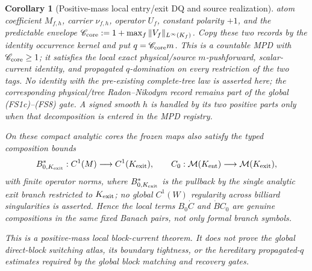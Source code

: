 \documentclass[11pt]{article}
\newtheorem{corollary}[theorem]{Corollary}
\begin{document}
\begin{corollary}[Positive-mass local entry/exit DQ and source realization]
atom coefficient $M_{f,h}$, carrier $\nu_{f,h}$, operator $U_f$, constant polarity
$+1$, and the predictable envelope
$\mathscr C_{\rm core}:=1+\max_f\|V_f\|_{L^\infty(K_f)}$.  Copy these two
records by the identity occurrence kernel and put $q=\mathscr C_{\rm core}m$.
This is a countable MPD with $\mathscr C_{\rm core}\ge1$; it satisfies the
local exact physical/source $m$-pushforward, scalar-current identity, and
propagated $q$-domination on every restriction of the two tags.  No identity
with the pre-existing complete-tree law is asserted here; the corresponding
physical/tree Radon--Nikodym record remains part of the global
\textup{(FS1c)}--\textup{(FS8)} gate.  A signed smooth $h$ is handled by its
two positive parts only when that decomposition is entered in the MPD
registry.

On these compact analytic cores the frozen maps also satisfy the typed
composition bounds
\begin{equation}
\label{eq:fixed-section-local-core-composition-bounds}
 B_{0,K_{\rm exit}}^*:C^1(M)\longrightarrow C^1(K_{\rm exit}),
 \qquad
 C_0:\mathcal M(K_{\rm ent})\longrightarrow
       \mathcal M(K_{\rm exit}),
\end{equation}
with finite operator norms, where $B_{0,K_{\rm exit}}^*$ is the pullback by
the single analytic exit branch restricted to $K_{\rm exit}$; no global
$C^1(W)$ regularity across billiard singularities is asserted.  Hence the
local terms $B_0\dot C$ and
$\dot B C_0$ are genuine compositions in the same fixed Banach pairs, not
only formal branch symbols.

This is a positive-mass local block-current theorem.  It does not prove the
global direct-block switching atlas, its boundary tightness, or the
hereditary propagated-$q$ estimates required by the global block matching
and recovery gates.
\end{corollary}
\end{document}
